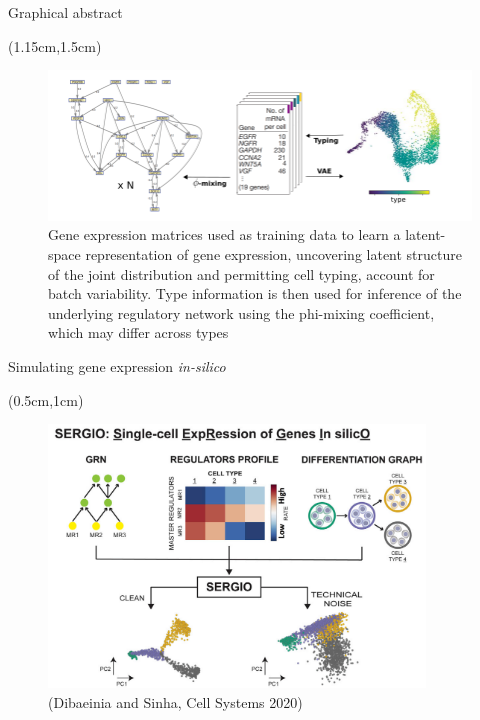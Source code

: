 \documentclass[aspectratio=1610]{beamer}					%
\begin{document}
\begin{frame}{Graphical abstract}

\begin{textblock*}{14cm}(1.15cm,1.5cm)
\begin{figure}
\includegraphics[width=14cm]{sketch.png}
\caption{Gene expression matrices used as training data to learn a latent-space representation of gene expression, uncovering latent structure of the joint distribution and permitting cell typing, account for batch variability. Type information is then used for inference of the underlying regulatory network using the phi-mixing coefficient, which may differ across types}
\end{figure}
\end{textblock*}

\end{frame}

\begin{frame}{Simulating gene expression \emph{in-silico}}
\begin{textblock*}{15cm}(0.5cm,1cm)
\begin{figure}
\includegraphics[width=10cm]{sergio.png}
\caption{(Dibaeinia and Sinha, Cell Systems 2020)}
\end{figure}
\end{textblock*}
\end{frame}
\end{document}
